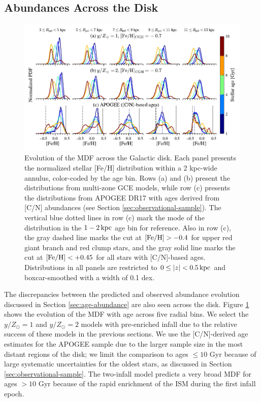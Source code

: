 \documentclass[twocolumn,twocolappendix,linenumbers]{aastex631}
\begin{document}
\subsection{Abundances Across the Disk}
\label{sec:disk-abundances}

\begin{figure}
    \centering
    \includegraphics[width=0.9\linewidth]{figures/mdf_evolution.pdf}
    \caption{Evolution of the MDF across the Galactic disk. Each panel presents the normalized stellar [Fe/H] distribution within a {2 kpc}-wide annulus, color-coded by the age bin. Rows (a) and (b) present the distributions from multi-zone GCE models, while row (c) presents the distributions from APOGEE DR17 with ages derived from [C/N] abundances (see Section \ref{sec:observational-sample}). The vertical blue dotted lines in row (c) mark the mode of the distribution in the $1-2\,{\rm kpc}$ age bin for reference. Also in row (c), the gray dashed line marks the cut at ${\rm [Fe/H]}>-0.4$ for upper red giant branch and red clump stars, and the gray solid line marks the cut at ${\rm [Fe/H]}<+0.45$ for all stars with [C/N]-based ages. Distributions in all panels are restricted to $0\leq|z|<0.5\,{\rm kpc}$ and boxcar-smoothed with a width of {0.1 dex}.}
    \label{fig:mdf-evolution}
\end{figure}

The discrepancies between the predicted and observed abundance evolution discussed in Section \ref{sec:age-abundance} are also seen across the disk. Figure \ref{fig:mdf-evolution} shows the evolution of the MDF with age across five radial bins. We select the $y/Z_\odot=1$ and $y/Z_\odot=2$ models with pre-enriched infall due to the relative success of these models in the previous sections. We use the [C/N]-derived age estimates for the APOGEE sample due to the larger sample size in the most distant regions of the disk; we limit the comparison to ages $\leq10$ Gyr because of large systematic uncertainties for the oldest stars, as discussed in Section \ref{sec:observational-sample}. The two-infall model predicts a very broad MDF for ages $>10$ Gyr because of the rapid enrichment of the ISM during the first infall epoch.
\end{document}
